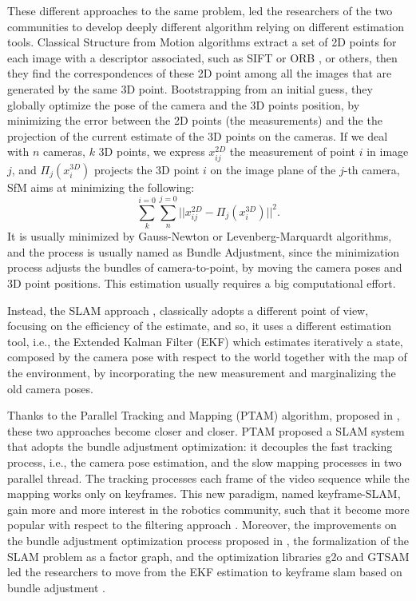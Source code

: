 These different approaches to the same problem, led the researchers of the two communities to develop deeply different algorithm relying on different estimation tools.
Classical Structure from Motion algorithms \cite{triggs2000bundle,sibley2009adaptive,wu2011multicore} extract a set of 2D points for each image with a descriptor associated, such as SIFT \cite{sift} or ORB \cite{orb}, or others, then they find the correspondences of these 2D point among all the images that are generated by the same 3D point. Bootstrapping from an initial guess, they globally optimize the pose of the camera and the 3D points position, by minimizing the error between the 2D points (the measurements) and the the projection of the current estimate of the 3D points on the cameras.
If we deal with $n$ cameras, $k$ 3D points, we express $x_{ij}^{2D}$ the measurement of point $i$ in image $j$, and $\Pi_j(x_i^{3D})$ projects the 3D point $i$ on the image plane of the $j$-th camera, SfM aims at minimizing the following:
\[
\sum_{k}^{i=0}\sum_{n}^{j=0}||x_{ij}^{2D} - \Pi_j(x_i^{3D})||^2.
\]
It is usually minimized by Gauss-Newton or Levenberg-Marquardt algorithms, and the process is usually named as Bundle Adjustment, since the minimization process adjusts the bundles of camera-to-point, by moving the camera poses and 3D point positions. This estimation usually requires a big computational effort.


Instead, the SLAM approach \cite{davison2007monoslam,ceriani2014single,grasa2011ekf}, classically adopts a different point of view, focusing on the efficiency of the estimate, and so, it uses a different estimation tool, i.e., the Extended Kalman Filter (EKF) which estimates iteratively a state, composed by the camera pose with respect to the world together with the map of the environment, by incorporating the new measurement and marginalizing the old camera poses.  


Thanks to the Parallel Tracking and Mapping (PTAM) algorithm, proposed in \cite{klein_murray07}, these two approaches become closer and closer. PTAM proposed a SLAM system that adopts the bundle adjustment optimization: it decouples the fast tracking process, i.e., the camera pose estimation, and the slow mapping processes in two parallel thread.  
The tracking processes each frame of the video sequence while the mapping works only on keyframes. 
This new paradigm, named keyframe-SLAM, gain more and more interest in the robotics community, such that it become more popular with respect to the filtering approach \cite{strasdat2010real}.
Moreover, the improvements on the bundle adjustment optimization process proposed in \cite{kaess2008isam},  the formalization of the SLAM problem as a factor graph\cite{thrun2006graph}, and the optimization libraries g2o \cite{kummerle2011g} and GTSAM \cite{dellaert2012factor} led the researchers to move from the EKF estimation to keyframe slam based on bundle adjustment \cite{strasdat11,sunderhauf2012towards,johannsson2013temporally}. 

